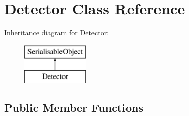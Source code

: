 \hypertarget{classDetector}{\section{Detector Class Reference}
\label{classDetector}
}
Inheritance diagram for Detector\-:\begin{figure}[H]
\begin{center}
\leavevmode
\includegraphics[height=2.000000cm]{classDetector}
\end{center}
\end{figure}
\subsection*{Public Member Functions}
